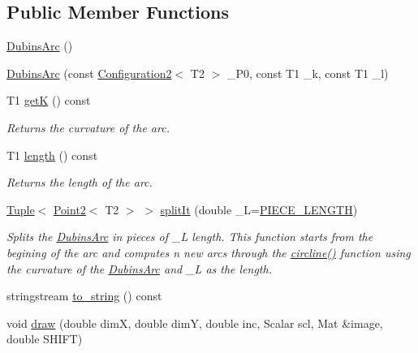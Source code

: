 \subsection*{Public Member Functions}
\begin{DoxyCompactItemize}
\item 
\mbox{\hyperlink{class_dubins_arc_ad09a4671b1b63f630d01b10ef3e48fb0}{Dubins\+Arc}} ()
\item 
\mbox{\hyperlink{class_dubins_arc_a213b0e587638328be1e448869e351475}{Dubins\+Arc}} (const \mbox{\hyperlink{class_configuration2}{Configuration2}}$<$ T2 $>$ \+\_\+\+P0, const T1 \+\_\+k, const T1 \+\_\+l)
\item 
T1 \mbox{\hyperlink{class_dubins_arc_af3fefdb90ba414db3560ef12b329f54a}{getK}} () const
\begin{DoxyCompactList}\small\item\em Returns the curvature of the arc. \end{DoxyCompactList}\item 
T1 \mbox{\hyperlink{class_dubins_arc_a1b0bfacb344d17377f4bda55fdaecae4}{length}} () const
\begin{DoxyCompactList}\small\item\em Returns the length of the arc. \end{DoxyCompactList}\item 
\mbox{\hyperlink{class_tuple}{Tuple}}$<$ \mbox{\hyperlink{class_point2}{Point2}}$<$ T2 $>$ $>$ \mbox{\hyperlink{class_dubins_arc_a346c19e3e9f25747e3e3ae9de997e09d}{split\+It}} (double \+\_\+L=\mbox{\hyperlink{dubins_8hh_a5b2500ca93a5100f73dc442d3cfea7d4}{P\+I\+E\+C\+E\+\_\+\+L\+E\+N\+G\+TH}})
\begin{DoxyCompactList}\small\item\em Splits the {\ttfamily \mbox{\hyperlink{class_dubins_arc}{Dubins\+Arc}}} in pieces of \+\_\+L length. This function starts from the begining of the arc and computes n new arcs through the {\ttfamily \mbox{\hyperlink{dubins_8hh_adef8b363044d7fed558e5b47d8d6a3a0}{circline()}}} function using the curvature of the {\ttfamily \mbox{\hyperlink{class_dubins_arc}{Dubins\+Arc}}} and \+\_\+L as the length. \end{DoxyCompactList}\item 
stringstream \mbox{\hyperlink{class_dubins_arc_aa90c32f88f048e4e17ea79489f44dbfb}{to\+\_\+string}} () const
\item 
void \mbox{\hyperlink{class_dubins_arc_a5ceb55d50ce337ff81c6d65a26761da6}{draw}} (double dimX, double dimY, double inc, Scalar scl, Mat \&image, double S\+H\+I\+FT)
\end{DoxyCompactItemize}
